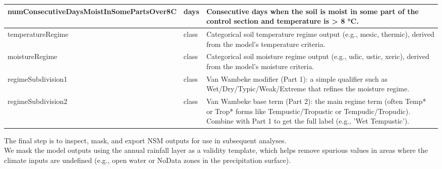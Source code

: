 \documentclass[
  10pt,
  b5paper,
  oneside]{book}
\begin{document}
\begin{tabular}{l|l|l}
\hline
numConsecutiveDaysMoistInSomePartsOver8C & days & Consecutive days when the soil is moist in some part of the control section and temperature is > 8 °C.\\
\hline
temperatureRegime & class & Categorical soil temperature regime output (e.g., mesic, thermic), derived from the model’s temperature criteria.\\
\hline
moistureRegime & class & Categorical soil moisture regime output (e.g., udic, ustic, xeric), derived from the model’s moisture criteria.\\
\hline
regimeSubdivision1 & class & Van Wambeke modifier (Part 1): a simple qualifier such as Wet/Dry/Typic/Weak/Extreme that refines the moisture regime.\\
\hline
regimeSubdivision2 & class & Van Wambeke base term (Part 2): the main regime term (often Temp* or Trop* forms like Tempustic/Tropustic or Tempudic/Tropudic). Combine with Part 1 to get the full label (e.g., 'Wet Tempustic').\\
\hline
\end{tabular}

The final step is to inspect, mask, and export NSM outputs for use in subsequent analyses.\\
We mask the model outputs using the annual rainfall layer as a validity template, which helps remove spurious values in areas where the climate inputs are undefined (e.g., open water or NoData zones in the precipitation surface).
\end{document}
